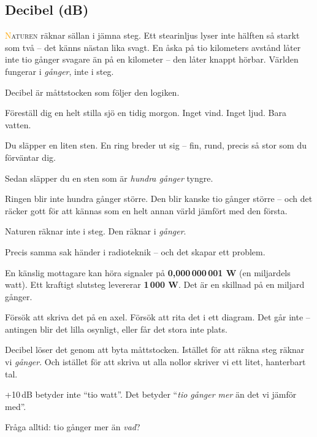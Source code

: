 \documentclass[a4paper,11pt,twoside]{book}
\newcommand{\emoji}[1]{{\emojifont #1}}
\begin{document}
\subsection{Decibel (dB)}

\lettrine[lines=2]{\textcolor{orange}{N}}{aturen} räknar sällan i jämna steg. Ett stearinljus lyser inte hälften så starkt som två -- det känns nästan lika svagt. En åska på tio kilometers avstånd låter inte tio gånger svagare än på en kilometer -- den låter knappt hörbar. Världen fungerar i \emph{gånger}, inte i steg.

Decibel är måttstocken som följer den logiken.

\begin{storybox}[{\emoji{🌧️} Regndropparna}]
Föreställ dig en helt stilla sjö en tidig morgon. 
Inget vind. Inget ljud. Bara vatten.

Du släpper en liten sten. En ring breder ut sig -- 
fin, rund, precis så stor som du förväntar dig.

Sedan släpper du en sten som är \emph{hundra gånger} tyngre.

Ringen blir inte hundra gånger större. Den blir kanske 
tio gånger större -- och det räcker gott för att kännas 
som en helt annan värld jämfört med den första.

Naturen räknar inte i steg. Den räknar i \emph{gånger}.
\end{storybox}

Precis samma sak händer i radioteknik -- och det skapar ett problem.

En känslig mottagare kan höra signaler på \textbf{0,000\,000\,001 W} (en miljardels watt). Ett kraftigt slutsteg levererar \textbf{1\,000 W}. Det är en skillnad på en miljard gånger.

Försök att skriva det på en axel. Försök att rita det i ett diagram. Det går inte -- antingen blir det lilla osynligt, eller får det stora inte plats.

Decibel löser det genom att byta måttstocken. Istället för att räkna steg räknar vi \emph{gånger}. Och istället för att skriva ut alla nollor skriver vi ett litet, hanterbart tal.

\begin{examplebox}[title={\emoji{💡} dB är alltid ett \emph{förhållande} -- inte ett absolut värde}]
+10\,dB betyder inte ``tio watt''. Det betyder ``\emph{tio gånger mer} än det vi jämför med''.

Fråga alltid: tio gånger mer än \emph{vad}?
\end{examplebox}
\end{document}
